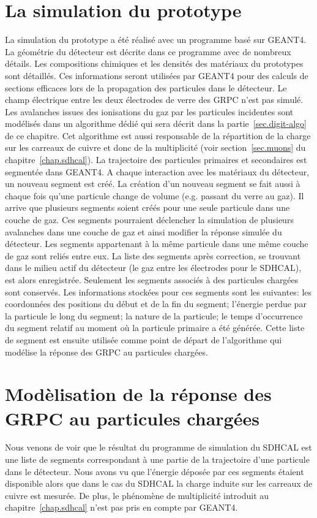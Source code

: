 \section{La simulation du prototype}
La simulation du prototype a été réalisé avec un programme basé sur GEANT4. La géométrie du détecteur est décrite dans ce programme avec de nombreux détails. Les compositions chimiques et les densités des matériaux du prototypes sont détaillés. Ces informations seront utilisées par GEANT4 pour des calculs de sections efficaces lors de la propagation des particules dans le détecteur. Le champ électrique entre les deux électrodes de verre des GRPC n'est pas simulé. Les avalanches issues des ionisations du gaz par les particules incidentes sont modélisés dans un algorithme dédié qui sera décrit dans la partie~\ref{sec.digit-algo} de ce chapitre. Cet algorithme est aussi responsable de la répartition de la charge sur les carreaux de cuivre et donc de la multiplicité (voir section~\ref{sec.muons} du chapitre~\ref{chap.sdhcal}). 
La trajectoire des particules primaires et secondaires est segmentée dans GEANT4. A chaque interaction avec les matériaux du détecteur, un nouveau segment est créé. La création d'un nouveau segment se fait aussi à chaque fois qu'une particule change de volume (e.g. passant du verre au gaz). Il arrive que plusieurs segments soient créés pour une seule particule dans une couche de gaz. Ces segments pourraient déclencher la simulation de plusieurs avalanches dans une couche de gaz et ainsi modifier la réponse simulée du détecteur. Les segments appartenant à la même particule dans une même couche de gaz sont reliés entre eux. 
La liste des segments après correction, se trouvant dans le milieu actif du détecteur (le gaz entre les électrodes pour le SDHCAL), est alors enregistrée. Seulement les segments associés à des particules chargées sont conservés. Les informations stockées pour ces segments sont les suivantes: les coordonnées des positions du début et de la fin du segment; l'énergie perdue par la particule le long du segment; la nature de la particule; le temps d’occurrence du segment relatif au moment où la particule primaire a été générée. 
Cette liste de segment est ensuite utilisée comme point de départ de l’algorithme qui modélise la réponse des GRPC au particules chargées.


\section{Modèlisation de la réponse des GRPC au particules chargées}
Nous venons de voir que le résultat du programme de simulation du SDHCAL est une liste de segments correspondant à une partie de la trajectoire d'une particule dans le détecteur. Nous avons vu que l'énergie déposée par ces segments étaient disponible alors que dans le cas du SDHCAL la charge induite sur les carreaux de cuivre est mesurée. De plus, le phénomène de multiplicité introduit au chapitre~\ref{chap.sdhcal} n'est pas pris en compte par GEANT4. 
\label{sec.digit-algo}

